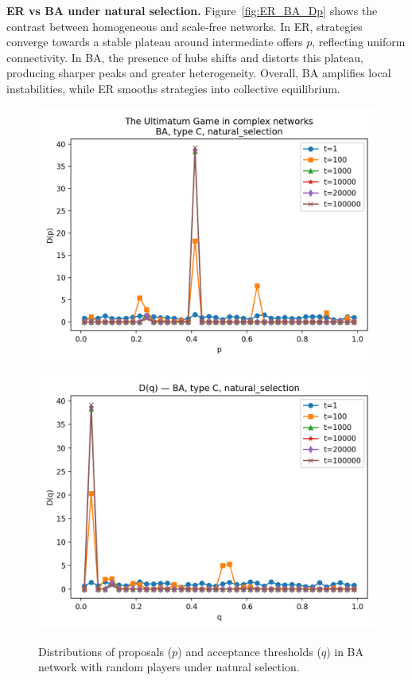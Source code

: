 \textbf{ER vs BA under natural selection.}  
Figure~\ref{fig:ER_BA_Dp} shows the contrast between homogeneous and scale-free
networks. In ER, strategies converge towards a stable plateau around
intermediate offers $p$, reflecting uniform connectivity.  
In BA, the presence of hubs shifts and distorts this plateau, producing sharper
peaks and greater heterogeneity. Overall, BA amplifies local instabilities,
while ER smooths strategies into collective equilibrium.

\begin{figure}[h!]
    \centering
    \setlength{\tabcolsep}{2pt}
    \begin{minipage}[t]{0.48\textwidth}
        \centering
        \includegraphics[width=\textwidth]{images/TASK1/Dp_BA_C_natural_selection.png}
        \label{fig:BA_Dp_C}
    \end{minipage}
    \hfill
    \begin{minipage}[t]{0.48\textwidth}
        \centering
        \includegraphics[width=\textwidth]{images/TASK1/Dq_BA_C_natural_selection.png}
        \label{fig:BA_Dq_C}
    \end{minipage}
    \caption{Distributions of proposals ($p$) and acceptance thresholds ($q$) in BA network with random players under natural selection.}
    \label{fig:BA_pq_C}
\end{figure}

